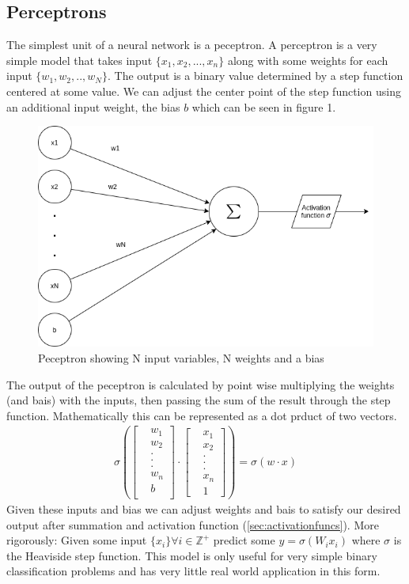\documentclass{article}
\begin{document}
\subsection{Perceptrons}
\label{sec:peceptrons}
The simplest unit of a neural network is a peceptron. A perceptron is a very simple model that takes input $\{x_1, x_2, ... ,x_n\}$ along with some weights for each input $\{w_1, w_2, .., w_N\}$. The output is a binary value determined by a step function centered at some value. \cite{Nielsen} We can adjust the center point of the step function using an additional input weight, the bias $b$ which can be seen in figure 1.
\begin{figure}[H]
\caption{Peceptron showing N input variables, N weights and a bias}
\includegraphics[scale=0.5]{peceptron.png}
\end{figure}
The output of the peceptron is calculated by point wise multiplying the weights (and bais) with the inputs, then passing the sum of the result through the step function. Mathematically this can be represented as a dot prduct of two vectors. 
\begin{align*}
\sigma \left(\begin{bmatrix}
&w_1 \\
&w_2 \\
&. \\
&. \\
&. \\
&w_n \\
&b \\
\end{bmatrix} 
\cdot 
\begin{bmatrix}
&x_1 \\
&x_2 \\
&. \\
&. \\
&. \\
&x_n \\
&1
\end{bmatrix}\right) = \sigma \left(w\cdot x\right)
\end{align*}
Given these inputs and bias we can adjust weights and bais to satisfy our desired output after summation and activation function (\ref{sec:activationfuncs}). 
More rigorously: Given some input $\{x_i\} \forall i\in \mathbb{Z^+}$ predict some $y=\sigma(W_i x_i)$ where $\sigma$ is the Heaviside step function. This model is only useful for very simple binary classification problems and has very little real world application in this form.
\end{document}
